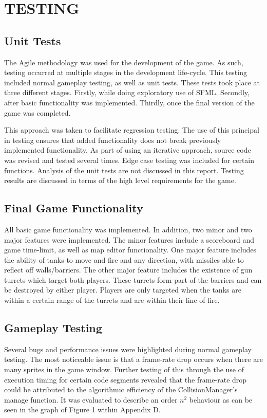 \documentclass[10pt,twocolumn]{witseiepaper}
\begin{document}
%
\section{TESTING} 

\subsection{Unit Tests}
The Agile methodology was used for the development of the game. As such, testing occurred at multiple stages in the development life-cycle. This testing included normal gameplay testing, as well as unit tests. These tests took place at three different stages. Firstly, while doing exploratory use of SFML. Secondly, after basic functionality was implemented. Thirdly, once the final version of the game was completed.

This approach was taken to facilitate regression testing. The use of this principal in testing ensures that added functionality does not break previously implemented functionality. As part of using an iterative approach, source code was revised and tested several times. Edge case testing was included for certain functions. Analysis of the unit tests are not discussed in this report. Testing results are discussed in terms of the high level requirements for the game.

\subsection{Final Game Functionality}
All basic game functionality was implemented. In addition, two minor and two major features were implemented. The minor features include a scoreboard and game time-limit, as well as map editor functionality. One major feature includes the ability of tanks to move and fire and any direction, with missiles able to reflect off walls/barriers. The other major feature includes the existence of gun turrets which target both players. These turrets form part of the barriers and can be destroyed by either player. Players are only targeted when the tanks are within a certain range of the turrets and are within their line of fire.

\subsection{Gameplay Testing}
Several bugs and performance issues were highlighted during normal gameplay testing. The most noticeable issue is that a frame-rate drop occurs when there are many sprites in the game window. Further testing of this through the use of execution timing for certain code segments revealed that the frame-rate drop could be attributed to the algorithmic efficiency of the CollisionManager's manage function. It was evaluated to describe an order $n^{2}$ behaviour as can be seen in the graph of Figure 1 within Appendix D. 
\end{document}
